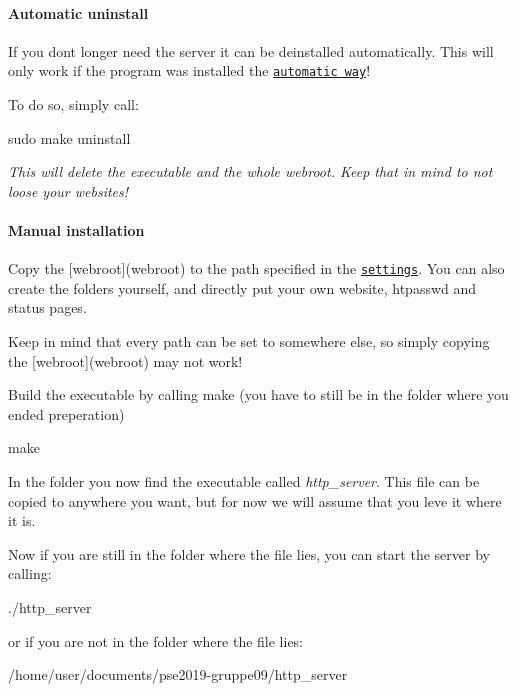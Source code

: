 \paragraph*{Automatic uninstall}

If you dont longer need the server it can be deinstalled automatically. This will only work if the program was installed the \href{#automatic-installation}{\tt automatic way}!

To do so, simply call\+:

sudo make uninstall

{\itshape This will delete the executable and the whole webroot. Keep that in mind to not loose your websites!} 



\paragraph*{Manual installation}


\begin{DoxyEnumerate}
\item Copy the \mbox{[}webroot\mbox{]}(webroot) to the path specified in the \href{#paths}{\tt settings}. You can also create the folders yourself, and directly put your own website, htpasswd and status pages.

Keep in mind that every path can be set to somewhere else, so simply copying the \mbox{[}webroot\mbox{]}(webroot) may not work!
\item Build the executable by calling make (you have to still be in the folder where you ended preperation) \begin{DoxyVerb}make
\end{DoxyVerb}

\item In the folder you now find the executable called {\itshape http\+\_\+server}. This file can be copied to anywhere you want, but for now we will assume that you leve it where it is.

Now if you are still in the folder where the file lies, you can start the server by calling\+: \begin{DoxyVerb}./http_server
\end{DoxyVerb}


or if you are not in the folder where the file lies\+: \begin{DoxyVerb}/home/user/documents/pse2019-gruppe09/http_server
\end{DoxyVerb}

\end{DoxyEnumerate}





